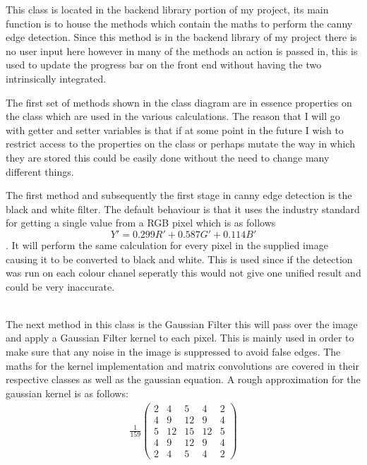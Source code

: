 \begin{FlushLeft}
    This class is located in the backend library portion of my project, its main function is to house the methods which contain the maths to perform the canny edge detection. Since this method is in the backend library of my project there is no user input here however in many of the methods an action is passed in, this is used to update the progress bar on the front end without having the two intrinsically integrated. \\ \bk

    The first set of methods shown in the class diagram are in essence properties on the class which are used in the various calculations. The reason that I will go with getter and setter variables is that if at some point in the future I wish to restrict access to the properties on the class or perhaps mutate the way in which they are stored this could be easily done without the need to change many different things. \\ \bk

    The first method and subsequently the first stage in canny edge detection is the black and white filter. The default behaviour is that it uses the industry standard for getting a single value from a RGB pixel which is as follows $$ Y' = 0.299R' + 0.587G' + 0.114B' $$.  It will perform the same calculation for every pixel in the supplied image causing it to be converted to black and white. This is used since if the detection was run on each colour chanel seperatly this would not give one unified result and could be very inaccurate.\\ 

    \\ \bk

    The next method in this class is the Gaussian Filter this will pass over the image and apply a Gaussian Filter kernel to each pixel. This is mainly used in order to make sure that any noise in the image is suppressed to avoid false edges. The maths for the kernel implementation and matrix convolutions are covered in their respective classes as well as the gaussian equation. A rough approximation for the gaussian kernel is as follows:\\

    \begin{gather*}
        \frac{1}{159}\begin{pmatrix}
            2 & 4 & 5 & 4 & 2 \\
            4 & 9 & 12 & 9 & 4 \\
            5 & 12 & 15 & 12 & 5 \\
            4 & 9 & 12 & 9 & 4 \\
            2 & 4 & 5 & 4 & 2
        \end{pmatrix}
    \end{gather*} \\


\end{FlushLeft}
